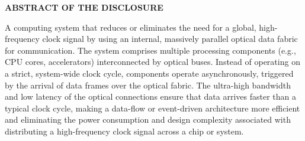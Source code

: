 \documentclass[11pt,letterpaper]{article}
\begin{document}
\thispagestyle{empty}

\begin{center}
    \textbf{\large ABSTRACT OF THE DISCLOSURE}
\end{center}

\vspace{0.6cm}

A computing system that reduces or eliminates the need for a global, high-frequency clock signal by using an internal, massively parallel optical data fabric for communication. The system comprises multiple processing components (e.g., CPU cores, accelerators) interconnected by optical buses. Instead of operating on a strict, system-wide clock cycle, components operate asynchronously, triggered by the arrival of data frames over the optical fabric. The ultra-high bandwidth and low latency of the optical connections ensure that data arrives faster than a typical clock cycle, making a data-flow or event-driven architecture more efficient and eliminating the power consumption and design complexity associated with distributing a high-frequency clock signal across a chip or system.
\end{document}
